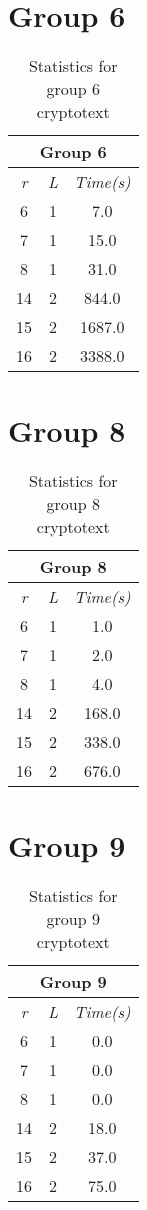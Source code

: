 \documentclass[[UTF8, a4paper, 11pt]{article}
\begin{document}
\section{Group 6}

\begin{table}
  \centering
  \begin{tabular}{ |c|c|c| }
    \hline
    \multicolumn{3}{|c|}{Group 6} \\
    \hline
    \emph{r} & \emph{L} & \emph{Time(s)} \\
    \hline
    6 & 1 & 7.0 \\
    7 & 1 & 15.0 \\
    8 & 1 & 31.0 \\
    14 & 2 & 844.0 \\
    15 & 2 & 1687.0 \\
    16 & 2 & 3388.0 \\
    \hline
  \end{tabular}
  \caption{Statistics for group 6 cryptotext}
\end{table}

\section{Group 8}

\begin{table}
  \centering
  \begin{tabular}{ |c|c|c| }
    \hline
    \multicolumn{3}{|c|}{Group 8} \\
    \hline
    \emph{r} & \emph{L} & \emph{Time(s)} \\
    \hline
    6 & 1 & 1.0 \\
    7 & 1 & 2.0 \\
    8 & 1 & 4.0 \\
    14 & 2 & 168.0 \\
    15 & 2 & 338.0 \\
    16 & 2 & 676.0 \\
    \hline
  \end{tabular}
  \caption{Statistics for group 8 cryptotext}
\end{table}

\section{Group 9}

\begin{table}
  \centering
  \begin{tabular}{ |c|c|c| }
    \hline
    \multicolumn{3}{|c|}{Group 9} \\
    \hline
    \emph{r} & \emph{L} & \emph{Time(s)} \\
    \hline
    6 & 1 & 0.0 \\
    7 & 1 & 0.0 \\
    8 & 1 & 0.0 \\
    14 & 2 & 18.0 \\
    15 & 2 & 37.0 \\
    16 & 2 & 75.0 \\
    \hline
  \end{tabular}
  \caption{Statistics for group 9 cryptotext}
\end{table}
\end{document}

